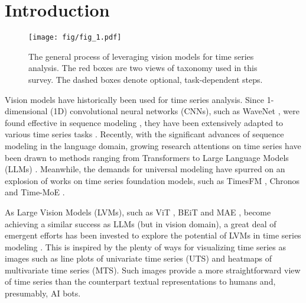 \section{Introduction}\label{sec.introduction}

\begin{figure}[!t]
\centering
\texttt{[image: fig/fig\_1.pdf]}
\caption{The general process of leveraging vision models for time series analysis. The red boxes are two views of taxonomy used in this survey. The dashed boxes denote optional, task-dependent steps.}\label{fig.structure}
\vspace{-0.2cm}
\end{figure}

Vision models have historically been used for time series analysis. %
Since 1-dimensional (1D) convolutional neural networks (CNNs), such as WaveNet \cite{van2016wavenet}, were found effective in sequence modeling \cite{bai2018empirical}, they have been extensively adapted to various time series tasks \cite{koprinska2018convolutional,zhang2020tapnet}. %
Recently, with the significant advances of sequence modeling in the language domain, growing research attentions on time series have been drawn to methods ranging from Transformers \cite{wen2023transformers} to Large Language Models (LLMs) \cite{zhang2024large}. Meanwhile, the demands for %
universal modeling have spurred on an explosion of works on time series foundation models, %
such as TimesFM \cite{das2024decoder}, %
Chronos \cite{ansari2024chronos} and Time-MoE \cite{shi2024time}.

As Large Vision Models (LVMs), such as ViT \cite{dosovitskiy2021image}, %
BEiT \cite{bao2022beit} and MAE \cite{he2022masked}, become achieving a similar success as LLMs (but in vision domain), a great deal of emergent efforts has been invested to explore the potential of LVMs in time series modeling \cite{chen2024visionts}. This is inspired by the plenty of ways for visualizing time series as images such as line plots of univariate time series (UTS) and heatmaps of multivariate time series (MTS). Such images provide a more straightforward view of time series than the counterpart textual representations to humans and, presumably, AI bots.

